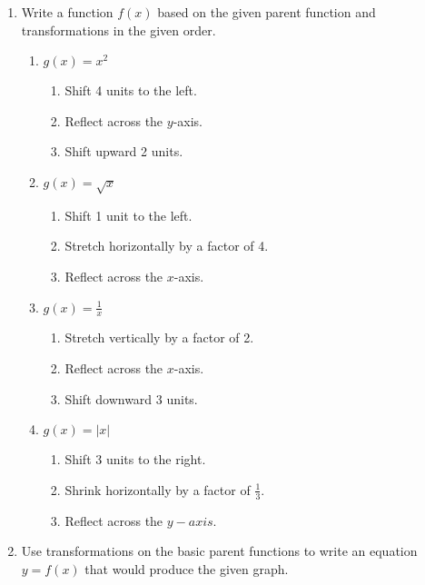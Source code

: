 \begin{enumerate}
\item Write a function $f(x)$ based on the given parent function and transformations in the given order.
\begin{enumerate}
\item $g(x)=x^2$ 
\begin{enumerate}
\item Shift 4 units to the left.
\item Reflect across the $y$-axis.
\item Shift upward 2 units.
\end{enumerate}

\vspace{1in}


\item $g(x)=\sqrt{x}$
\begin{enumerate}
\item Shift 1 unit to the left.
\item Stretch horizontally by a factor of 4.
\item Reflect across the $x$-axis.
\end{enumerate}

\vspace{1in}

\item $\displaystyle g(x)=\frac{1}{x}$
\begin{enumerate}
\item Stretch vertically by a factor of 2.
\item Reflect across the $x$-axis.
\item Shift downward 3 units.
\end{enumerate}

\vspace{1in}

\item $\displaystyle g(x)=|x|$
\begin{enumerate}
\item Shift 3 units to the right.
\item Shrink horizontally by a factor of $\displaystyle \frac{1}{3}$.
\item Reflect across the $y-axis$.
\end{enumerate}

\vspace{1in}

\end{enumerate}

\vfill
\newpage


\item Use transformations on the basic parent functions to write an equation $y=f(x)$ that would produce the given graph.


\end{enumerate}
